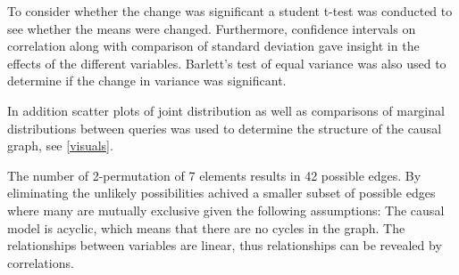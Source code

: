 \documentclass[12pt,fleqn,]{article}
\begin{document}
\begin{multicols}{2}
To consider whether the change was significant a student t-test was conducted to see whether the means were changed. Furthermore, confidence intervals on correlation along with comparison of standard deviation gave insight in the effects of the different variables. Barlett's test of equal variance was also used to determine if the change in variance was significant. 

In addition scatter plots of joint distribution as well as comparisons of marginal distributions between queries was used to determine the structure of the causal graph, see \ref{visuals}. 

The number of 2-permutation of 7 elements results in 42 possible edges. By eliminating the unlikely possibilities achived a smaller subset of possible edges where many are mutually exclusive given the following assumptions: The causal model is acyclic, which means that there are no cycles in the graph. The relationships between variables are linear, thus relationships can be revealed by correlations.






\end{multicols}
\end{document}
